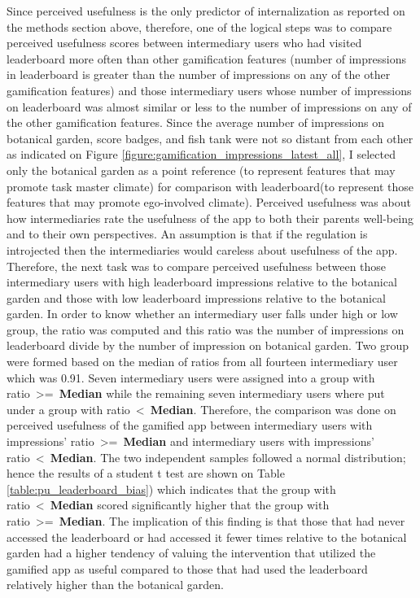 Since perceived usefulness is the only predictor of internalization as reported on the methods section above, therefore, one of the logical steps was to compare perceived usefulness scores between intermediary users who had visited leaderboard more often than other gamification features (number of impressions in leaderboard is greater than the number of impressions on any of the other gamification features) and those intermediary users whose number of impressions on leaderboard was almost similar or less to the number of impressions on any of the other gamification features. Since the average number of impressions on botanical garden, score badges, and fish tank were not so distant from each other as indicated on Figure \ref{figure:gamification_impressions_latest_all}, I selected only the botanical garden as a point reference (to represent features that may promote task master climate) for comparison with leaderboard(to represent those features that may promote ego-involved climate). Perceived usefulness was about how intermediaries rate the usefulness of the app to  both their parents well-being and to their own perspectives. An assumption is that if the regulation is introjected then the intermediaries would careless about usefulness of the app. Therefore, the next task was to compare perceived usefulness between those intermediary users with high leaderboard impressions relative to the botanical garden and those with low leaderboard impressions relative to the botanical garden. In order to know whether an intermediary user falls under high or low group, the ratio was computed and this ratio was the number of impressions on leaderboard divide by the number of impression on botanical garden. Two group were formed based on the median of ratios from all fourteen intermediary user which was 0.91. Seven intermediary users were assigned into a group with ratio~\textgreater=~\textbf{Median} while the remaining seven intermediary users where put under a group with ratio~\textless~\textbf{Median}. Therefore, the comparison was done on perceived usefulness of the gamified app between intermediary users with impressions' ratio~\textgreater=~\textbf{Median} and intermediary users with impressions' ratio~\textless~\textbf{Median}. The two independent samples followed a normal distribution; hence the results  of a student t test are shown on Table \ref{table:pu_leaderboard_bias}) which indicates that the group with ratio~\textless~\textbf{Median} scored significantly higher that the group with ratio~\textgreater=~\textbf{Median}. The implication of this finding is that those that had never accessed the leaderboard or had accessed it fewer times relative to the botanical garden had a higher tendency of valuing the intervention that utilized the gamified app as useful compared to those that had used the leaderboard relatively higher than the botanical garden. 

